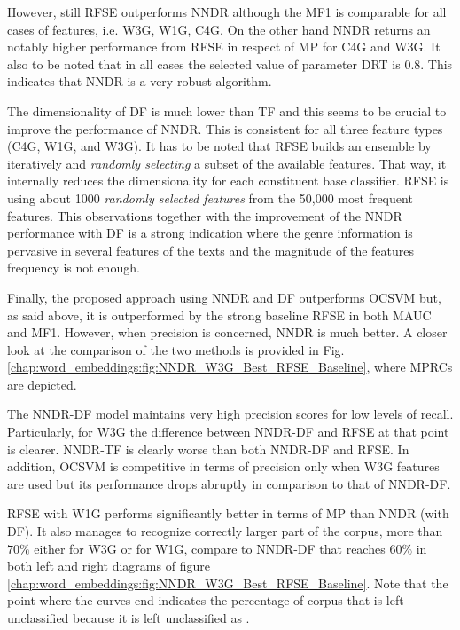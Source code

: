 {However, still RFSE outperforms NNDR although the MF1 is comparable for all cases of features, i.e. W3G, W1G, C4G. On the other hand NNDR returns an notably higher performance from RFSE in respect of MP for C4G and W3G. It also to be noted that in all cases the selected value of parameter DRT is 0.8. This indicates that NNDR is a very robust algorithm.

The dimensionality of DF is much lower than TF and this seems to be crucial to improve the performance of NNDR. This is consistent for all three feature types (C4G, W1G, and W3G). It has to be noted that RFSE builds an ensemble by iteratively and \textit{randomly selecting} a subset of the available features. That way, it internally reduces the dimensionality for each constituent base classifier. RFSE is using about 1000 \textit{randomly selected features} from the 50,000 most frequent features. This observations together with the improvement of the NNDR performance with DF is a strong indication where the genre information is pervasive in several features of the texts and the magnitude of the features frequency is not enough. 

Finally, the proposed approach using NNDR and DF outperforms OCSVM but, as said above, it is outperformed by the strong baseline RFSE in both MAUC and MF1. However, when precision is concerned, NNDR is much better. A closer look at  the comparison of the two methods is provided in Fig. \ref{chap:word_embeddings:fig:NNDR_W3G_Best_RFSE_Baseline}, where MPRCs are depicted. 

The NNDR-DF model maintains very high precision scores for low levels of recall. Particularly, for W3G the difference between NNDR-DF and RFSE at that point is clearer. NNDR-TF is clearly worse than both NNDR-DF and RFSE. In addition, OCSVM is competitive in terms of precision only when W3G features are used but its performance drops abruptly in comparison to that of NNDR-DF. 

RFSE with W1G performs significantly better in terms of MP than NNDR (with DF). It also manages to recognize correctly larger part of the corpus, more than $70\%$ either for W3G or for W1G, compare to NNDR-DF that reaches $60\%$ in both left and right diagrams of figure \ref{chap:word_embeddings:fig:NNDR_W3G_Best_RFSE_Baseline}. Note that the point where the curves end indicates the percentage of corpus that is left unclassified because it is left unclassified as .

}
